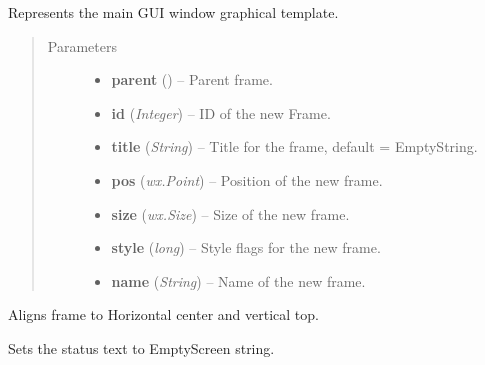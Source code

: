 \documentclass[letterpaper,10pt,english]{sphinxmanual}
\begin{document}
\begin{fulllineitems}
\label{graphicaldesign:graphicaldesign.GUItemplate}
Represents the main GUI window graphical template.
\begin{quote}\begin{description}
\item[{Parameters}] \leavevmode\begin{itemize}
\item {} 
\textbf{parent} () -- Parent frame.

\item {} 
\textbf{id} (\emph{Integer}) -- ID of the new Frame.

\item {} 
\textbf{title} (\emph{String}) -- Title for the frame, default = EmptyString.

\item {} 
\textbf{pos} (\emph{wx.Point}) -- Position of the new frame.

\item {} 
\textbf{size} (\emph{wx.Size}) -- Size of the new frame.

\item {} 
\textbf{style} (\emph{long}) -- Style flags for the new frame.

\item {} 
\textbf{name} (\emph{String}) -- Name of  the new frame.

\end{itemize}

\end{description}\end{quote}

\begin{fulllineitems}
\label{graphicaldesign:graphicaldesign.GUItemplate.AlignCenterTop}
Aligns frame to Horizontal center and vertical top.

\end{fulllineitems}


\begin{fulllineitems}
\label{graphicaldesign:graphicaldesign.GUItemplate.ClearStatusText}
Sets the status text to EmptyScreen string.


\end{fulllineitems}
\end{fulllineitems}
\end{document}
